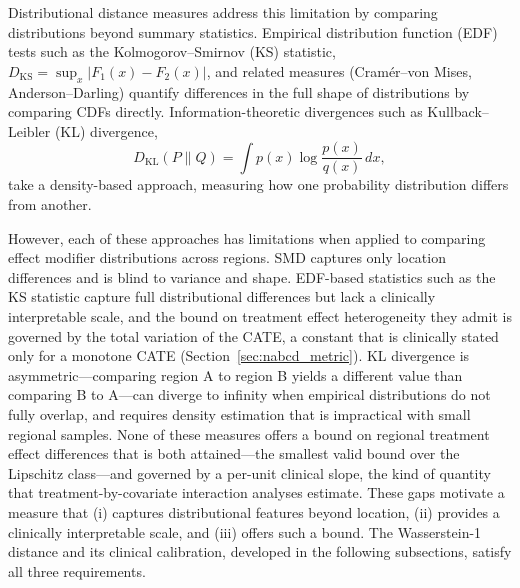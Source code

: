 \documentclass[AMA,Times1COL]{WileyNJDv5}
\begin{document}
Distributional distance measures address this limitation by comparing distributions beyond summary statistics. Empirical distribution function (EDF) tests such as the Kolmogorov--Smirnov (KS) statistic, $D_{\text{KS}} = \sup_x |F_1(x) - F_2(x)|$, and related measures (Cram\'{e}r--von Mises, Anderson--Darling) quantify differences in the full shape of distributions by comparing CDFs directly. Information-theoretic divergences such as Kullback--Leibler (KL) divergence,
\begin{equation}
D_{\text{KL}}(P \| Q) = \int p(x) \log \frac{p(x)}{q(x)} \, dx,
\label{eq:kl}
\end{equation}
take a density-based approach, measuring how one probability distribution differs from another.

However, each of these approaches has limitations when applied to comparing effect modifier distributions across regions. SMD captures only location differences and is blind to variance and shape. EDF-based statistics such as the KS statistic capture full distributional differences but lack a clinically interpretable scale, and the bound on treatment effect heterogeneity they admit is governed by the total variation of the CATE, a constant that is clinically stated only for a monotone CATE (Section~\ref{sec:nabcd_metric}). KL divergence is asymmetric---comparing region A to region B yields a different value than comparing B to A---can diverge to infinity when empirical distributions do not fully overlap, and requires density estimation that is impractical with small regional samples. None of these measures offers a bound on regional treatment effect differences that is both attained---the smallest valid bound over the Lipschitz class---and governed by a per-unit clinical slope, the kind of quantity that treatment-by-covariate interaction analyses estimate. These gaps motivate a measure that (i) captures distributional features beyond location, (ii) provides a clinically interpretable scale, and (iii) offers such a bound. The Wasserstein-1 distance and its clinical calibration, developed in the following subsections, satisfy all three requirements.
\end{document}
